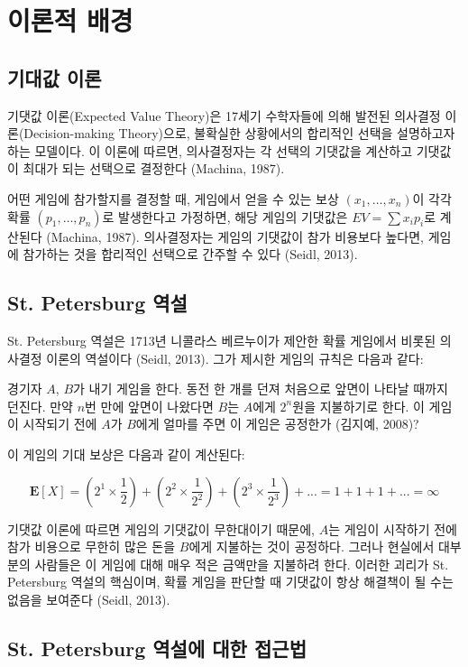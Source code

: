 \chapter{이론적 배경}

\section{기대값 이론}

기댓값 이론(Expected Value Theory)은 17세기 수학자들에 의해 발전된 의사결정 이론(Decision-making Theory)으로, 불확실한 상황에서의 합리적인 선택을 설명하고자 하는 모델이다. 이 이론에 따르면, 의사결정자는 각 선택의 기댓값을 계산하고 기댓값이 최대가 되는 선택으로 결정한다 (Machina, 1987).

어떤 게임에 참가할지를 결정할 때, 게임에서 얻을 수 있는 보상 $(x_1, \dots, x_n)$이 각각 확률 $(p_1, \dots, p_n)$로 발생한다고 가정하면, 해당 게임의 기댓값은 $EV = \sum x_i p_i$로 계산된다 (Machina, 1987). 의사결정자는 게임의 기댓값이 참가 비용보다 높다면, 게임에 참가하는 것을 합리적인 선택으로 간주할 수 있다 (Seidl, 2013).

\section{St. Petersburg 역설}

St. Petersburg 역설은 1713년 니콜라스 베르누이가 제안한 확률 게임에서 비롯된 의사결정 이론의 역설이다 (Seidl, 2013). 그가 제시한 게임의 규칙은 다음과 같다:

경기자 $A$, $B$가 내기 게임을 한다. 동전 한 개를 던져 처음으로 앞면이 나타날 때까지 던진다. 만약 $n$번 만에 앞면이 나왔다면 $B$는 $A$에게 $2^n$원을 지불하기로 한다. 이 게임이 시작되기 전에 $A$가 $B$에게 얼마를 주면 이 게임은 공정한가 (김지예, 2008)?

이 게임의 기대 보상은 다음과 같이 계산된다:

$$
  \mathbf E[X] = (2^1 \times \frac 12) + (2^2 \times \frac 1{2^2}) + (2^3 \times \frac 1{2^3}) + ... = 1 + 1 + 1 + ... = \infty
$$

기댓값 이론에 따르면 게임의 기댓값이 무한대이기 때문에, $A$는 게임이 시작하기 전에 참가 비용으로 무한히 많은 돈을 $B$에게 지불하는 것이 공정하다. 그러나 현실에서 대부분의 사람들은 이 게임에 대해 매우 적은 금액만을 지불하려 한다. 이러한 괴리가 St. Petersburg 역설의 핵심이며, 확률 게임을 판단할 때 기댓값이 항상 해결책이 될 수는 없음을 보여준다 (Seidl, 2013).


\section{St. Petersburg 역설에 대한 접근법}

